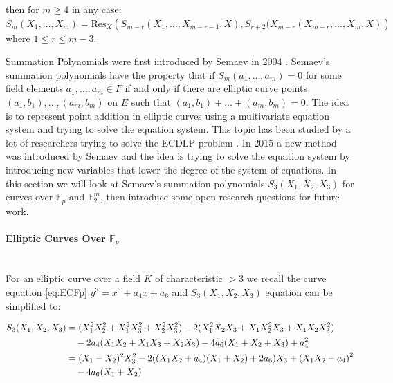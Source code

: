 then for $m \geq 4 $ in any case: \\
$S_m(X_1,\dots,X_m)=\text{Res}_X\left( S_{m-r}\left(X_1,\dots, X_{m-r-1},X \right), S_{r+2}(X_{m-r}\left( X_{m-r},\dots,X_m,X\right)  \right) $\\
where $1 \leq r \leq m-3$.

Summation Polynomials were first introduced by Semaev in 2004 \cite{semaev2004summation}. Semaev's summation polynomials have the property that if $S_m(a_1,\dots,a_m) = 0 $ for some field elements $a_1,\dots,a_m \in F$ if and only if there are elliptic curve points $\left( a_1, b_1\right), \dots,\left( a_m,b_m \right) $ on $E$ such that $\left( a_1, b_1\right)+ \dots + \left( a_m, b_m\right) = 0 $. The idea is to represent point addition in elliptic curves using a multivariate equation system and trying to solve the equation system. This topic has been studied by a lot of researchers trying to solve the ECDLP problem \cite{diem2011discrete,gaudry2004index,faugere2014using,faugere2012improving,petit2012polynomial,huang2013improvement}. In 2015 a new method was introduced by Semaev \cite{cryptoeprint:2015:310} and the idea is trying to solve the equation system by introducing new variables that lower the degree of the system of equations. In this section we will look at Semaev's summation polynomials $S_3\left( X_1,X_2,X_3\right) $ for curves over $\mathbb{F}_p$ and $\mathbb{F}_2^m$, then introduce some open research questions for future work.  \\

\paragraph{Elliptic Curves Over $\mathbb{F}_p$} \mbox{} \\
For an elliptic curve over a field $K$ of characteristic $> 3$ we recall the curve equation \ref{eq:ECFp}
$y^3=x^3+a_4x+a_6$ and $S_3\left( X_1,X_2,X_3\right) $ equation can be simplified to: \cite{kosters2015notes} 

\begin{equation} \label{eq:fpCurveS3}
\begin{split}
S_3( X_1,X_2,X_3) &=( X_1^2X_2^2+X_1^2X_3^2+X_2^2X_3^2)- 2( X_1^2X_2X_3+X_1X_2^2X_3+X_1X_2X_3^2) \\
&\text{\space \space \space } -2a_4(X_1X_2+X_1X_3+X_2X_3 ) -4a_6( X_1+X_2+X_3) +a_4^2 \\
&= ( X_1-X_2)^2X_3^2-2( ( X_1X_2+a_4)(X_1+X_2 ) + 2a_6) X_3 + \left(X_1X_2-a_4 \right) ^2 \\
&\text{\space \space \space } - 4a_6(X_1+X_2)
\end{split}
\end{equation}

